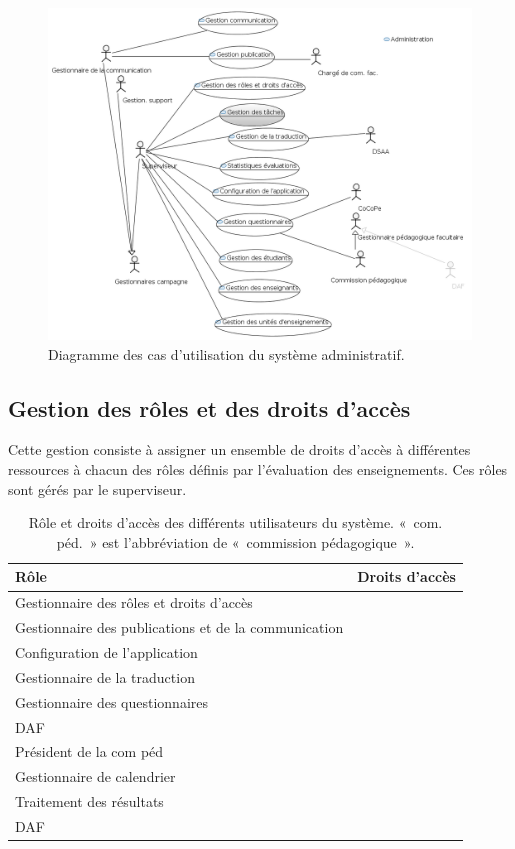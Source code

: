 \documentclass[a4paper,11pt]{report}
\begin{document}
\begin{figure}[ht]
\includegraphics[width=\linewidth]{workspace/evalens-usecases/administration.png}
\caption{Diagramme des cas d'utilisation du système administratif.}
\label{fig:usecase-admin}
\end{figure}


\subsection{Gestion des rôles et des droits d'accès}
Cette gestion consiste à assigner un ensemble de droits d'accès à différentes ressources à chacun des rôles définis par l'évaluation des enseignements.
Ces rôles sont gérés par le superviseur.

\begin{table}[ht]
\begin{tabularx}{\textwidth}{|l|X|} \hline
Rôle & Droits d'accès \\ \hline
Gestionnaire des rôles et droits d'accès & \\ \hline
Gestionnaire des publications et de la communication & \\ \hline
Configuration de l'application & \\ \hline
Gestionnaire de la traduction & \\ \hline
Gestionnaire des questionnaires & \\ \hline
DAF & \\ \hline
Président de la com péd & \\ \hline
Gestionnaire de calendrier & \\ \hline
Traitement des résultats & \\ \hline
DAF & \\ \hline

\end{tabularx}
\caption{Rôle et droits d'accès des différents utilisateurs du système. «~com. péd.~» est l'abbréviation de «~commission pédagogique~».}
\label{tab:role-droit}
\end{table}
\end{document}
